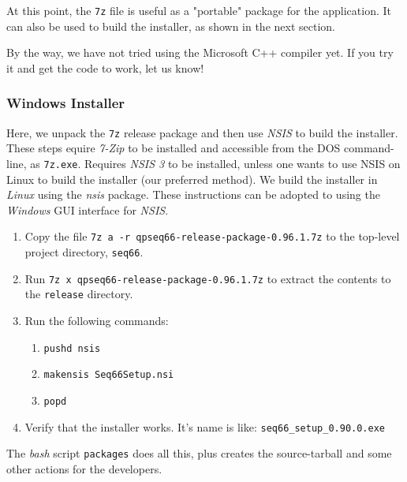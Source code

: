    At this point, the \texttt{7z} file is useful as a "portable" package
   for the application.  It can also be used to build the installer, as
   shown in the next section.

   By the way, we have not tried using the Microsoft C++ compiler yet.
   If you try it and get the code to work, let us know!

\subsubsection{Windows Installer}
\label{subsec:seq66_build_installer_windows}

   Here, we unpack the \texttt{7z} release package and then use
   \textsl{NSIS} to build the installer.
   These steps equire \textsl{7-Zip}
   to be installed and accessible from the DOS
   command-line, as \texttt{7z.exe}.
   Requires \textsl{NSIS 3} to be installed, unless one wants to use
   NSIS on Linux to build the installer (our preferred method).
   We build the installer in \textsl{Linux} using the
   \textsl{nsis} package.  These instructions can be adopted to using the
   \textsl{Windows} GUI interface for \textsl{NSIS}.

   \begin{enumerate}
      \item Copy the file
         \texttt{7z a -r qpseq66-release-package-0.96.1.7z} to
         the top-level project directory, \texttt{seq66}.
      \item Run
         \texttt{7z x qpseq66-release-package-0.96.1.7z} to extract
         the contents to the \texttt{release} directory.
      \item Run the following commands:
         \begin{enumerate}
            \item \texttt{pushd nsis}
            \item \texttt{makensis Seq66Setup.nsi}
            \item \texttt{popd}
         \end{enumerate}
      \item Verify that the installer works.  It's name is like:
         \texttt{seq66\_setup\_0.90.0.exe}
   \end{enumerate}

   The \textsl{bash} script \texttt{packages} does all this, plus
   creates the source-tarball and some other actions for the developers.

